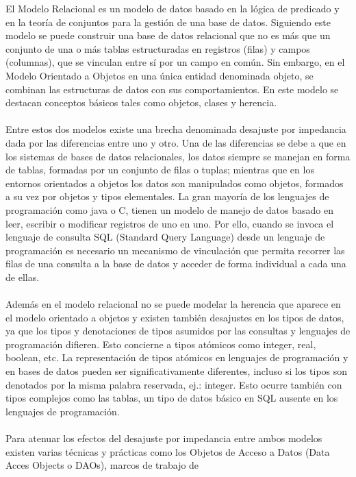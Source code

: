 \documentclass[preprint,12pt]{elsarticle}
\begin{document}
El Modelo Relacional es un modelo de datos basado en la lógica de predicado y en la teoría de conjuntos
para la gestión de una base de datos. Siguiendo este modelo se puede construir una base de datos
relacional que no es más que un conjunto de una o más tablas estructuradas en registros (filas) y
campos (columnas), que se vinculan entre sí por un campo en común. Sin embargo, en el Modelo
Orientado a Objetos en una única entidad denominada objeto, se combinan las estructuras de datos con
sus comportamientos. En este modelo se destacan conceptos básicos tales como objetos, clases y
herencia.
\\
\\
Entre estos dos modelos existe una brecha denominada desajuste por impedancia dada por las
diferencias entre uno y otro. Una de las diferencias se debe a que en los sistemas de bases de datos
relacionales, los datos siempre se manejan en forma de tablas, formadas por un conjunto de filas o
tuplas; mientras que en los entornos orientados a objetos los datos son manipulados como objetos,
formados a su vez por objetos y tipos elementales.
La gran mayoría de los lenguajes de programación como java o C, tienen un modelo de manejo de datos
basado en leer, escribir o modificar registros de uno en uno. Por ello, cuando se invoca el lenguaje de
consulta SQL (Standard Query Language) desde un lenguaje de programación es necesario un
mecanismo de vinculación que permita recorrer las filas de una consulta a la base de datos y acceder de
forma individual a cada una de ellas.\cite{referenciarobles1}
\\
\\
Además en el modelo relacional no se puede modelar la herencia que aparece en el modelo orientado a
objetos y existen también desajustes en los tipos de datos, ya que los tipos y denotaciones de tipos
asumidos por las consultas y lenguajes de programación difieren. Esto concierne a tipos atómicos como
integer, real, boolean, etc. La representación de tipos atómicos en lenguajes de programación y en
bases de datos pueden ser significativamente diferentes, incluso si los tipos son denotados por la misma
palabra reservada, ej.: integer. Esto ocurre también con tipos complejos como las tablas, un tipo de
datos básico en SQL ausente en los lenguajes de programación.
\\
\\
Para atenuar los efectos del desajuste por impedancia entre ambos modelos existen varias técnicas y
prácticas como los Objetos de Acceso a Datos (Data Acces Objects o DAOs), marcos de trabajo de
\end{document}
